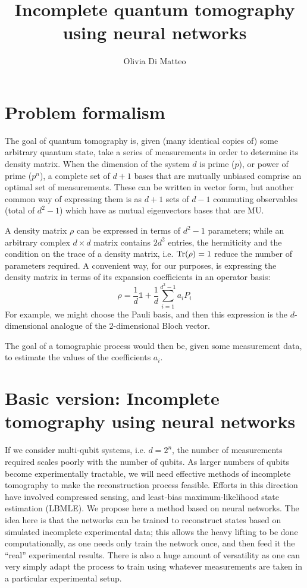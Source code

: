 \documentclass[a4paper,10pt]{article}
\title{Incomplete quantum tomography using neural networks}
\author{Olivia Di Matteo}
\begin{document}
\maketitle

\section{Problem formalism}

The goal of quantum tomography is, given (many identical copies of) some arbitrary quantum state, take a series of measurements in order to determine its density matrix. When the dimension of the system $d$ is prime ($p$), or power of prime ($p^n$), a complete set of $d + 1$ bases that are mutually unbiased comprise an optimal set of measurements. These can be written in vector form, but another common way of expressing them is as $d + 1$ sets of $d - 1$ commuting observables (total of $d^2-1$) which have as mutual eigenvectors bases that are MU.

A density matrix $\rho$ can be expressed in terms of $d^2 - 1$ parameters; while an arbitrary complex $d \times d$ matrix contains $2d^2$ entries, the hermiticity and the condition on the trace of a density matrix, i.e. $\hbox{Tr}(\rho) = 1$ reduce the number of parameters required. A convenient way, for our purposes, is expressing the density matrix in terms of its expansion coefficients in an operator basis:
\begin{equation}
 \rho = \frac{1}{d} \mathds{1} + \frac{1}{d} \sum_{i = 1}^{d^2 - 1} a_i P_i
\end{equation}
\noindent For example, we might choose the Pauli basis, and then this expression is the $d$-dimensional analogue of the 2-dimensional Bloch vector.

The goal of a tomographic process would then be, given some measurement data, to estimate the values of the coefficients $a_i$.

\section{Basic version: Incomplete tomography using neural networks}

If we consider multi-qubit systems, i.e. $d = 2^n$, the number of measurements required scales poorly with the number of qubits. As larger numbers of qubits become experimentally tractable, we will need effective methods of incomplete tomography to make the reconstruction process feasible. Efforts in this direction have involved compressed sensing, and least-bias maximum-likelihood state estimation (LBMLE). We propose here a method based on neural networks. The idea here is that the networks can be trained to reconstruct states based on simulated incomplete experimental data; this allows the heavy lifting to be done computationally, as one needs only train the network once, and then feed it the ``real'' experimental results. There is also a huge amount of versatility as one can very simply adapt the process to train using whatever measurements are taken in a particular experimental setup.
\end{document}
